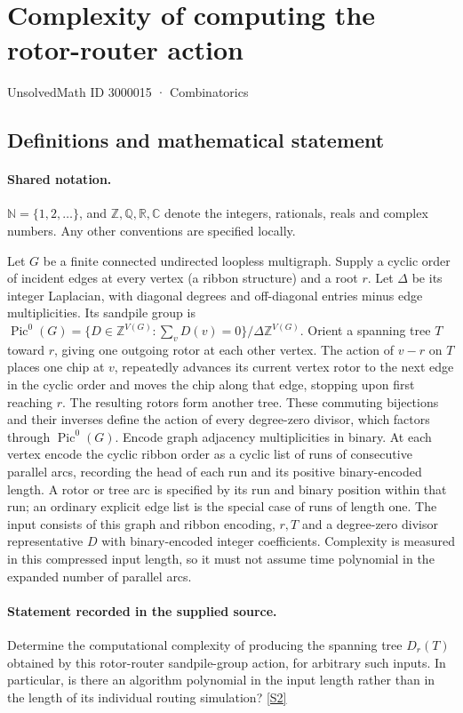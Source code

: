 \documentclass[11pt]{article}
\newcommand{\sref}[2]{\hyperlink{source:#1:#2}{[S#2]}}
\begin{document}
\setcounter{section}{3000014}
\section{Complexity of computing the rotor-router action}\label{3000015}
{\small\sffamily UnsolvedMath ID 3000015 · Combinatorics}
\subsection{Definitions and mathematical statement}

\paragraph{Shared notation.}$\mathbb N=\{1,2,\ldots\}$, and $\mathbb Z,\mathbb Q,\mathbb R,\mathbb C$ denote the integers, rationals, reals and complex numbers. Any other conventions are specified locally.


Let $G$ be a finite connected undirected loopless multigraph. Supply a cyclic order of incident edges at every vertex (a ribbon structure) and a root $r$. Let $\Delta$ be its integer Laplacian, with diagonal degrees and off-diagonal entries minus edge multiplicities. Its sandpile group is $\operatorname{Pic}^0(G)=\{D\in\mathbb Z^{V(G)}:\sum_v D(v)=0\}/\Delta\mathbb Z^{V(G)}$. Orient a spanning tree $T$ toward $r$, giving one outgoing rotor at each other vertex. The action of $v-r$ on $T$ places one chip at $v$, repeatedly advances its current vertex rotor to the next edge in the cyclic order and moves the chip along that edge, stopping upon first reaching $r$. The resulting rotors form another tree. These commuting bijections and their inverses define the action of every degree-zero divisor, which factors through $\operatorname{Pic}^0(G)$. Encode graph adjacency multiplicities in binary. At each vertex encode the cyclic ribbon order as a cyclic list of runs of consecutive parallel arcs, recording the head of each run and its positive binary-encoded length. A rotor or tree arc is specified by its run and binary position within that run; an ordinary explicit edge list is the special case of runs of length one. The input consists of this graph and ribbon encoding, $r,T$ and a degree-zero divisor representative $D$ with binary-encoded integer coefficients. Complexity is measured in this compressed input length, so it must not assume time polynomial in the expanded number of parallel arcs.
\paragraph{Statement recorded in the supplied source.}
Determine the computational complexity of producing the spanning tree $D_r(T)$ obtained by this rotor-router sandpile-group action, for arbitrary such inputs. In particular, is there an algorithm polynomial in the input length rather than in the length of its individual routing simulation? \sref{3000015}{2}
\end{document}
